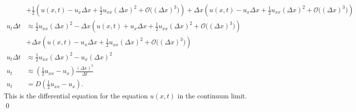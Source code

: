 \documentclass[10pt]{amsart}
\theoremstyle{nonumberplain}
\begin{document}
\begin{enumerate}[label={\bf {\arabic*}:}]
\begin{align*}
	& + \frac 1 2 \left( u(x, t) - u_x \Delta x + \frac 1 2 u_{xx} (\Delta x)^2 + \mathcal O\big((\Delta x)^3\big) \right) + \Delta x \left( u(x, t) - u_x \Delta x + \frac 1 2 u_{xx} (\Delta x)^2 + \mathcal O\big((\Delta x)^3\big) \right) \\
u_t \Delta t &\approx \frac 1 2 u_{xx} (\Delta x)^2 - \Delta x \left( u(x, t) + u_x \Delta x + \frac 1 2 u_{xx} (\Delta x)^2 + \mathcal O\big((\Delta x)^3\big)\right) \\
	& + \Delta x \left( u(x, t) - u_x \Delta x + \frac 1 2 u_{xx} (\Delta x)^2 + \mathcal O\big((\Delta x)^3\big) \right) \\
u_t \Delta t &\approx \frac 1 2 u_{xx} (\Delta x)^2 - u_x (\Delta x)^2 \\
u_t &\approx \left( \frac 1 2 u_{xx} - u_x \right) \frac {(\Delta x)^2}{\Delta t} \\
u_t &= D \left( \frac 1 2 u_{xx} - u_x \right).
\end{align*}
This is the differential equation for the equation $u(x, t)$ in the continuum limit. \\
\qed \\

\newpage


\end{enumerate}
\end{document}
